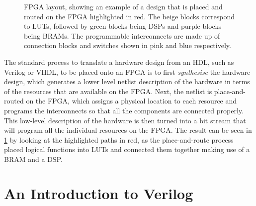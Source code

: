 \begin{figure}
  \caption[FPGA layout showing a place and routed design.]{\Gls{FPGA} layout,
    showing an example of a design that is placed and routed on the \gls{FPGA}
    highlighted in red.  The beige blocks correspond to \glspl{LUT}, followed by
    green blocks being \glspl{DSP} and purple blocks being \glspl{BRAM}.  The
    programmable interconnects are made up of connection blocks and switches
    shown in pink and blue respectively.}%
  \label{fig:bg:fpga-layout}
\end{figure}

The standard process to translate a hardware design from an \gls{HDL}, such as
Verilog or VHDL, to be placed onto an \gls{FPGA} is to first \emph{synthesise}
the hardware design, which generates a lower level netlist description of the
hardware in terms of the resources that are available on the \gls{FPGA}.  Next,
the netlist is place-and-routed on the \gls{FPGA}, which assigns a physical
location to each resource and programs the interconnects so that all the
components are connected properly.  This low-level description of the hardware
is then turned into a bit stream that will program all the individual resources
on the \gls{FPGA}.  The result can be seen in \cref{fig:bg:fpga-layout} by
looking at the highlighted paths in red, as the place-and-route process placed
logical functions into \glspl{LUT} and connected them together making use of a
\gls{BRAM} and a \gls{DSP}.

\section{An Introduction to Verilog}%
\label{sec:bg:intro-to-verilog}

